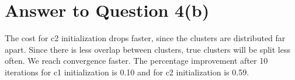 \documentclass[11pt]{article}
\begin{document}
\section*{Answer to Question 4(b)}
The cost for c2 initialization drops faster, since the clusters are distributed far apart. Since there is less overlap between clusters, true clusters will be split less often. We reach convergence faster.
The percentage improvement after 10 iterations for c1 initialization is 0.10 and for c2 initialization is 0.59.
\end{document}
